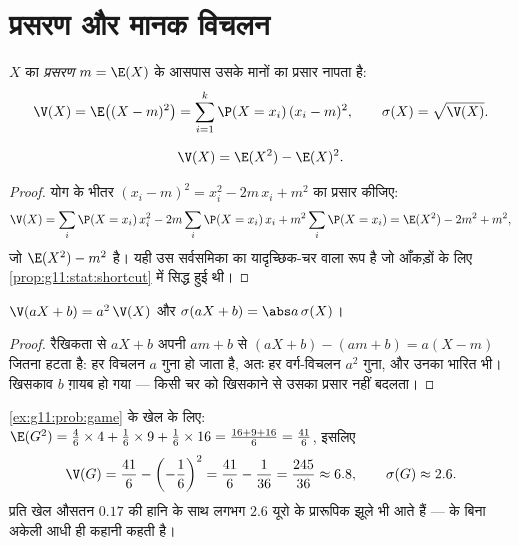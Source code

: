 \section{प्रसरण और मानक विचलन}

\begin{definition}[प्रसरण]\label{def:g11:prob:variance}
$X$ का \emph{प्रसरण}  $m = \E(X)$ के आसपास उसके मानों का
प्रसार नापता है:
\[
\V(X) = \E\bigl((X - m)^2\bigr)
= \sum_{i=1}^{k} \P(X = x_i)\,(x_i - m)^2,
\qquad
\sigma(X) = \sqrt{\V(X)} .
\]
\end{definition}

\begin{proposition}[संक्षिप्त सूत्र]\label{prop:g11:prob:konig}
\[
\V(X) = \E(X^2) - \E(X)^2 .
\]
\end{proposition}

\begin{proof}
योग के भीतर $(x_i - m)^2 = x_i^2 - 2m\,x_i + m^2$ का प्रसार कीजिए:
\[
\V(X) = \sum_i \P(X = x_i)\,x_i^2
- 2m \sum_i \P(X = x_i)\,x_i + m^2\sum_i \P(X = x_i)
= \E(X^2) - 2m^2 + m^2 ,
\]
जो $\E(X^2) - m^2$ है। यही उस सर्वसमिका का यादृच्छिक-चर वाला रूप है जो आँकड़ों के लिए
\cref{prop:g11:stat:shortcut} में सिद्ध हुई थी।
\end{proof}

\begin{proposition}\label{prop:g11:prob:affine}
$\V(aX + b) = a^2\,\V(X)$ और $\sigma(aX + b) = \abs a\,\sigma(X)$।
\end{proposition}

\begin{proof}
रैखिकता से $aX + b$ अपनी  $a m + b$ से $(aX + b) - (am + b) = a(X - m)$ जितना हटता है: हर विचलन $a$
गुना हो जाता है, अतः हर वर्ग-विचलन $a^2$ गुना, और उनका भारित  भी।
खिसकाव $b$ ग़ायब हो गया --- किसी चर को खिसकाने से उसका प्रसार नहीं बदलता।
\end{proof}

\begin{example}\label{ex:g11:prob:variance}
\cref{ex:g11:prob:game} के खेल के लिए: $\E(G^2) = \frac46 \times 4 + \frac16 \times 9 + \frac16 \times 16
= \frac{16 + 9 + 16}{6} = \frac{41}{6}$, इसलिए
\[
\V(G) = \frac{41}{6} - \left(-\frac16\right)^2
= \frac{41}{6} - \frac{1}{36} = \frac{245}{36} \approx 6.8,
\qquad
\sigma(G) \approx 2.6 .
\]
प्रति खेल औसतन $0.17$ की हानि के साथ लगभग $2.6$ यूरो के प्रारूपिक झूले भी
आते हैं ---  के बिना अकेली  आधी ही कहानी कहती है।
\end{example}

